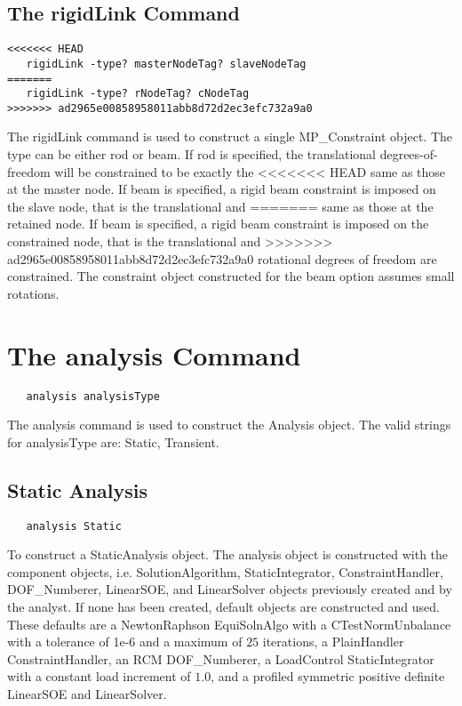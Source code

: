 \documentclass[12pt]{article}
\begin{document}
\subsection{The rigidLink Command}
{\sf\small
\begin{verbatim}
<<<<<<< HEAD
   rigidLink -type? masterNodeTag? slaveNodeTag
=======
   rigidLink -type? rNodeTag? cNodeTag
>>>>>>> ad2965e00858958011abb8d72d2ec3efc732a9a0
\end{verbatim}
}

The rigidLink command is used to construct a single MP\_Constraint object.
The type can be either rod or beam. If rod is specified, the
translational degrees-of-freedom will be constrained to be exactly the
<<<<<<< HEAD
same as those at the master node. If beam is specified, a rigid beam
constraint is imposed on the slave node, that is the translational and
=======
same as those at the retained node. If beam is specified, a rigid beam
constraint is imposed on the constrained node, that is the translational and
>>>>>>> ad2965e00858958011abb8d72d2ec3efc732a9a0
rotational degrees of freedom are constrained. The constraint object
constructed for the beam option assumes small rotations.

\section {The analysis Command}

{\sf\small
\begin{verbatim}
   analysis analysisType 
\end{verbatim}
}

The analysis command is used to construct the Analysis object.
The valid strings for analysisType are: Static, Transient. 

\subsection{Static Analysis}

{\sf\small
\begin{verbatim}
   analysis Static 
\end{verbatim}
}

To construct a StaticAnalysis object. The analysis object is
constructed with the component objects, i.e. SolutionAlgorithm, StaticIntegrator,
ConstraintHandler, DOF\_Numberer, LinearSOE, and LinearSolver objects
previously created and by the analyst. If none has been created,
default objects are constructed and used. These defaults are a
NewtonRaphson EquiSolnAlgo with a CTestNormUnbalance with a tolerance
of 1e-6 and a maximum of $25$ iterations, a PlainHandler
ConstraintHandler, an RCM DOF\_Numberer, a LoadControl
StaticIntegrator with a constant load increment of $1.0$, and a
profiled symmetric positive definite LinearSOE and LinearSolver.
\end{document}
